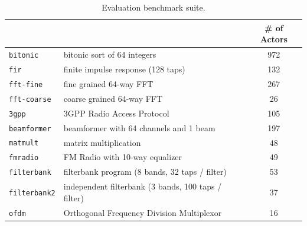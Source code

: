 \documentclass{sigplanconf}
\begin{document}
\begin{table}[t]
\vspace{6pt}
\nocaptionrule
\center
\label{tab:benchmarks}
{\scriptsize
\begin{tabular}{|l|l|c|} \hline
\hspace{-2pt}{\bf Benchmark}&\hspace{-2pt}{\bf Description}& \hspace{-6pt} {\bf \# of Actors} \hspace{-6pt} \\ \hline \hline
\hspace{-2pt}\texttt{bitonic	} &\hspace{-2pt}bitonic sort of 64 integers	&	972 \\ \hline
\hspace{-2pt}\texttt{fir	      } &\hspace{-2pt} finite impulse response (128 taps)&	132 \\ \hline
\hspace{-2pt}\texttt{fft-fine	} &\hspace{-2pt}fine grained 64-way FFT	&	267 \\ \hline
\hspace{-2pt}\texttt{fft-coarse}\hspace{-2pt} &\hspace{-2pt}coarse grained 64-way FFT	&	26 \\ \hline
\hspace{-2pt}\texttt{3gpp	} &\hspace{-2pt}3GPP Radio Access Protocol	&	105 \\ \hline
\hspace{-2pt}\texttt{beamformer} & \hspace{-2pt}beamformer with 64 channels and 1 beam & 197 \\ \hline
\hspace{-2pt}\texttt{matmult	} & \hspace{-2pt}matrix multiplication	&	48 \\ \hline
\hspace{-2pt}\texttt{fmradio	} & \hspace{-2pt}FM Radio with 10-way equalizer	&	49 \\ \hline
\hspace{-2pt}\texttt{filterbank}\hspace{-2pt} & \hspace{-2pt}filterbank program (8 bands, 32 taps / filter)	&	53 \\ \hline
\hspace{-2pt}\texttt{filterbank2}\hspace{-3pt}& \hspace{-2pt}independent filterbank (3 bands, 100 taps / filter) &	37 \\ \hline
\hspace{-2pt}\texttt{ofdm	 }& \hspace{-2pt}Orthogonal Frequency Division Multiplexor~\cite{spectrumware}	&	16 \\ \hline
\end{tabular}
}
\caption{Evaluation benchmark suite.}
\vspace{6pt}
\end{table}
\end{document}
